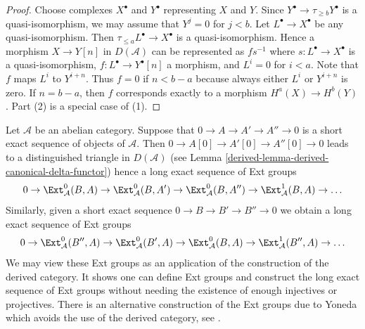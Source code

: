 \begin{proof}
Choose complexes $X^\bullet$ and $Y^\bullet$ representing $X$ and $Y$.
Since $Y^\bullet \to \tau_{\geq b}Y^\bullet$ is a quasi-isomorphism,
we may assume that $Y^j = 0$ for $j < b$.
Let $L^\bullet \to X^\bullet$ be any quasi-isomorphism.
Then $\tau_{\leq a}L^\bullet \to X^\bullet$
is a quasi-isomorphism. Hence a morphism $X \to Y[n]$
in $D(\mathcal{A})$ can be represented as $fs^{-1}$ where
$s : L^\bullet \to X^\bullet$ is a quasi-isomorphism,
$f : L^\bullet \to Y^\bullet[n]$ a morphism, and
$L^i = 0$ for $i < a$. Note that $f$ maps $L^i$ to $Y^{i + n}$.
Thus $f = 0$ if $n < b - a$ because always either $L^i$ or $Y^{i + n}$ is
zero. If $n = b - a$, then $f$ corresponds exactly to a morphism
$H^a(X) \to H^b(Y)$. Part (2) is a special case of (1).
\end{proof}

Let $\mathcal{A}$ be an abelian category.
Suppose that $0 \to A \to A' \to A'' \to 0$ is a short exact
sequence of objects of $\mathcal{A}$. Then
$0 \to A[0] \to A'[0] \to A''[0] \to 0$ leads to a distinguished
triangle in $D(\mathcal{A})$ (see
Lemma \ref{derived-lemma-derived-canonical-delta-functor})
hence a long exact sequence of Ext groups
$$
0 \to \Ext^0_\mathcal{A}(B, A) \to
\Ext^0_\mathcal{A}(B, A') \to
\Ext^0_\mathcal{A}(B, A'') \to
\Ext^1_\mathcal{A}(B, A) \to \ldots
$$
Similarly, given a short exact sequence $0 \to B \to B' \to B'' \to 0$
we obtain a long exact sequence of Ext groups
$$
0 \to \Ext^0_\mathcal{A}(B'', A) \to
\Ext^0_\mathcal{A}(B', A) \to
\Ext^0_\mathcal{A}(B, A) \to
\Ext^1_\mathcal{A}(B'', A) \to \ldots
$$
We may view these Ext groups as an application of the construction of the
derived category. It shows one can define Ext groups and construct
the long exact sequence of Ext groups without needing the existence of enough
injectives or projectives. There is an alternative construction of the Ext
groups due to Yoneda which avoids the use of the derived category, see
\cite{Yoneda}.


